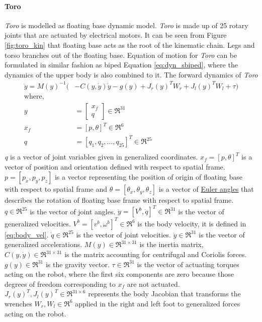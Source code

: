 \paragraph{Toro}
\emph{Toro} is modelled as floating base dynamic model. \emph{Toro} is made up of 25 rotary joints that are actuated by electrical motors. It can be seen from Figure \ref{fig:toro_kin} that floating base acts as the root of the kinematic chain. Legs and torso branches out of the floating base. Equation of motion for \emph{Toro} can be formulated in similar fashion as biped Equation \ref{eq:dyn_sbiped}, where the dynamics of the upper body is also combined to it. The forward dynamics of \emph{Toro} 
\begin{equation}
	\label{eq:motion}
	\begin{split}
	\ddot{y} = M(y)^{-1}(&-C(y,\dot{y})\dot{y} - g(y) + J_r(y)^{T}W_{r} +J_l(y)^{T}W_{l} + \tau) \\
	\text{where,}\\ y &=
	\begin{bmatrix}
	 x_f \\ q 
	\end{bmatrix} \in \Re ^{31} \\
	x_f &= [p,\theta]^T \in \Re ^6 \\
	q &= [q_{1},q_{2},\ldots , q_{25}]^T \in \Re ^{25}\\
	\end{split}
\end{equation}
\emph{q} is a vector of joint variables given in generalized coordinates. $x_{f}=[p,\theta]^{T}$ is a vector of position and orientation defined with respect to spatial frame. $p=[p_x,p_y,p_z]$ is a vector representing  the position of origin of floating base with respect to spatial frame and $\theta=[\theta_{x},\theta_{y},\theta_{z}]$ is a vector of \underline{Euler angles}  that describes the rotation of floating base frame with respect to spatial frame. $q \in \Re^{25}$ is the vector of joint angles. $\dot{y}=[V^{b},\dot{q}]^T \in \Re^{31}$ is the vector of generalized velocities. $V^b= [v^b,\omega^b]^T \in \Re^{6}$ is the body velocity, it is defined in \ref{eq:body_vel}. $\dot{q} \in \Re^{25}$ is the vector of joint velocities. $\ddot{y}\in \Re^{31}$ is the vector of generalized accelerations. $M(y)\in \Re^{31 \times 31}$ is the inertia matrix, $C(y,\dot{y})\in \Re^{31 \times 31}$ is the matrix accounting for centrifugal and Coriolis forces. $g(y) \in \Re^{31}$ is the gravity vector. $\tau \in \Re^{31}$ is the vector of actuating torques acting on the robot, where the first six components are zero because those degrees of freedom corresponding to $x_f$ are not actuated. $J_r(y)^{T},J_l(y)^{T} \in \Re^{31 \times 6}$ represents the body Jacobian that transforms the wrenches $W_r,W_l \in \Re^{6}$ applied in the right and left foot to generalized forces acting on the robot.

